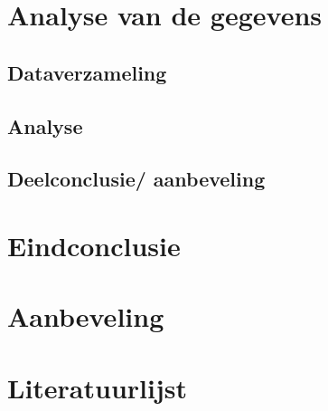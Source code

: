 \documentclass[11pt]{article}
\begin{document}
	\newpage
	
	\section{Analyse van de gegevens}
	\subsection{Dataverzameling}
	\subsection{Analyse}
	\subsection{Deelconclusie/ aanbeveling}
	
	\newpage
	
	\section{Eindconclusie}
	
	\newpage
	
	\section{Aanbeveling}
	
	\newpage
	
	\section{Literatuurlijst}
	
	\newpage
\end{document}
